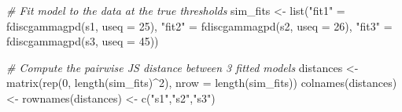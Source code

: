 \documentclass[]{article}
\newcommand{\hlnum}[1]{\textcolor[rgb]{0.816,0.125,0.439}{#1}}%
\newcommand{\hlstr}[1]{\textcolor[rgb]{0.251,0.627,0.251}{#1}}%
\newcommand{\hlcom}[1]{\textcolor[rgb]{0.502,0.502,0.502}{\textit{#1}}}%
\newcommand{\hlstd}[1]{\textcolor[rgb]{0.251,0.251,0.251}{#1}}%
\newcommand{\hlkwc}[1]{\textcolor[rgb]{0.251,0.251,0.251}{#1}}%
\newcommand{\hlkwd}[1]{\textcolor[rgb]{0.878,0.439,0.125}{#1}}%
\newenvironment{Shaded}{\begin{myshaded}}{\end{myshaded}}
\newcommand{\KeywordTok}[1]{\hlkwd{#1}}
\newcommand{\DataTypeTok}[1]{\hlkwc{#1}}
\newcommand{\DecValTok}[1]{\hlnum{#1}}
\newcommand{\StringTok}[1]{\hlstr{#1}}
\newcommand{\CommentTok}[1]{\hlcom{#1}}
\newcommand{\NormalTok}[1]{\hlstd{#1}}
\theoremstyle{definition}
\theoremstyle{definition}
\theoremstyle{definition}
\theoremstyle{remark}
\begin{document}
\begin{Shaded}
\begin{Highlighting}[]
\CommentTok{# Fit model to the data at the true thresholds}
\NormalTok{sim_fits <-}\StringTok{ }\KeywordTok{list}\NormalTok{(}\StringTok{"fit1"} \NormalTok{=}\StringTok{ }\KeywordTok{fdiscgammagpd}\NormalTok{(s1, }\DataTypeTok{useq =} \DecValTok{25}\NormalTok{),}
                 \StringTok{"fit2"} \NormalTok{=}\StringTok{ }\KeywordTok{fdiscgammagpd}\NormalTok{(s2, }\DataTypeTok{useq =} \DecValTok{26}\NormalTok{),}
                 \StringTok{"fit3"} \NormalTok{=}\StringTok{ }\KeywordTok{fdiscgammagpd}\NormalTok{(s3, }\DataTypeTok{useq =} \DecValTok{45}\NormalTok{))}

\CommentTok{# Compute the pairwise JS distance between 3 fitted models}
\NormalTok{distances <-}\StringTok{ }\KeywordTok{matrix}\NormalTok{(}\KeywordTok{rep}\NormalTok{(}\DecValTok{0}\NormalTok{, }\KeywordTok{length}\NormalTok{(sim_fits)^}\DecValTok{2}\NormalTok{), }\DataTypeTok{nrow =} \KeywordTok{length}\NormalTok{(sim_fits))}
\KeywordTok{colnames}\NormalTok{(distances) <-}\StringTok{ }\KeywordTok{rownames}\NormalTok{(distances) <-}\StringTok{ }\KeywordTok{c}\NormalTok{(}\StringTok{"s1"}\NormalTok{,}\StringTok{"s2"}\NormalTok{,}\StringTok{"s3"}\NormalTok{)}


\end{Highlighting}
\end{Shaded}
\end{document}
